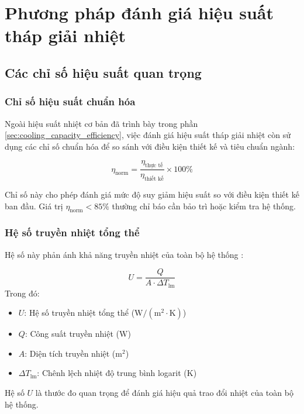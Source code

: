 \documentclass[../main.tex]{subfiles}
\begin{document}
\section{Phương pháp đánh giá hiệu suất tháp giải nhiệt}
\label{sec:performance_evaluation_methods}

\subsection{Các chỉ số hiệu suất quan trọng}
\label{sec:key_performance_indicators}

\subsubsection{Chỉ số hiệu suất chuẩn hóa}
Ngoài hiệu suất nhiệt cơ bản đã trình bày trong phần \ref{sec:cooling_capacity_efficiency}, việc đánh giá hiệu suất tháp giải nhiệt còn sử dụng các chỉ số chuẩn hóa để so sánh với điều kiện thiết kế và tiêu chuẩn ngành:

\begin{equation}
    \eta_{\text{norm}} = \frac{\eta_{\text{thực tế}}}{\eta_{\text{thiết kế}}} \times 100\%
\end{equation}

Chỉ số này cho phép đánh giá mức độ suy giảm hiệu suất so với điều kiện thiết kế ban đầu. Giá trị $\eta_{\text{norm}} < 85\%$ thường chỉ báo cần bảo trì hoặc kiểm tra hệ thống.

\subsubsection{Hệ số truyền nhiệt tổng thể}
Hệ số này phản ánh khả năng truyền nhiệt của toàn bộ hệ thống \cite{marriott_practical_thermal_2009}:

\begin{equation}
    U = \frac{Q}{A \cdot \Delta T_{\text{lm}}}
\end{equation}
Trong đó:
\begin{itemize}
    \item $U$: Hệ số truyền nhiệt tổng thể ($\mathrm{W/(m^2 \cdot K)}$)
    \item $Q$: Công suất truyền nhiệt ($\mathrm{W}$)
    \item $A$: Diện tích truyền nhiệt ($\mathrm{m^2}$)
    \item $\Delta T_{\text{lm}}$: Chênh lệch nhiệt độ trung bình logarit ($\mathrm{K}$)
\end{itemize}
Hệ số $U$ là thước đo quan trọng để đánh giá hiệu quả trao đổi nhiệt của toàn bộ hệ thống.
\end{document}
